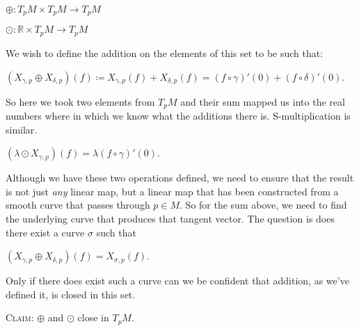 \documentclass[12pt, a4paper]{article}
\begin{document}
\vspace{4mm}

\centerline{$\oplus\colon T_pM\times T_pM\rightarrow T_pM$}
\vspace{2mm}
\centerline{$\odot\colon \mathbb{R}\times T_pM\rightarrow T_pM$\hspace{5mm}}

\vspace{4mm}

We wish to define the addition on the elements of this set to be such that:\par

\vspace{4mm}

\centerline{$(X_{\gamma, p}\oplus X_{\delta, p})(f)\coloneqq X_{\gamma, p}(f)+X_{\delta, p}(f)=(f\circ\gamma)'(0)+(f\circ\delta)'(0)$.}

\vspace{4mm}

So here we took two elements from $T_pM$ and their sum mapped us into the real numbers where in which we know what the additions there is. S-multiplication is similar.

\vspace{4mm}

\centerline{$(\lambda\odot X_{\gamma, p})(f)=\lambda(f\circ\gamma)'(0)$.}

\vspace{4mm}

Although we have these two operations defined, we need to ensure that the result is not just \textit{any} linear map, but a linear map that has been constructed from a smooth curve that passes through $p\in M$. So for the sum above, we need to find the underlying curve that produces that tangent vector. The question is does there exist a curve $\sigma$ such that\par

\vspace{4mm}

\centerline{$(X_{\gamma, p}\oplus X_{\delta, p})(f)=X_{\sigma, p}(f)$.}

\newpage

Only if there does exist such a curve can we be confident that addition, as we've defined it, is closed in this set.

\vspace{4mm}

\begin{flushleft}
\textsc{Claim:} $\oplus$ and $\odot$ close in $T_pM$.
\end{flushleft}
\end{document}

